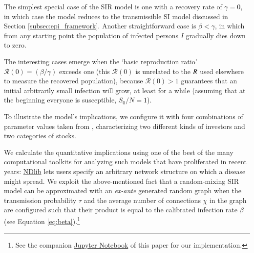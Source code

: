 The simplest special case of the SIR model is one with a recovery rate of $\gamma=0$, in which case the model reduces to the transmissible SI model discussed in Section \ref{subsec:epi_framework}.  Another straightforward case is $\beta < \gamma$, in which from any starting point the population of infected persons $I$ gradually dies down to zero.

\newcommand{\Rzero}{\mathcal{R}(0)}
The interesting cases emerge when the `basic reproduction ratio' $\Rzero = (\beta/\gamma)$ exceeds one (this $\Rzero$ is unrelated to the $\Recovered$ used elsewhere to measure the recovered population), because $\Rzero > 1$ guarantees that an initial arbitrarily small infection will grow, at least for a while (assuming that at the beginning everyone is susceptible, $S_{0}/N = 1$).

To illustrate the model's implications, we configure it with four combinations of parameter values taken from \cite{shiller1989survey}, characterizing two different kinds of investors and two categories of stocks.  %


We calculate the quantitative implications using one of the best of the many computational toolkits for analyzing such models that have proliferated in recent years:  %
\href{https://ndlib.readthedocs.io/en/latest/}{NDlib} lets users specify an arbitrary network structure on which a disease might spread. We exploit the above-mentioned fact that a random-mixing SIR model can be approximated with an \textit{ex-ante} generated random graph when the transmission probability $\tau$ and the average number of connections $\chi$ in the graph are configured such that their product is equal to the calibrated infection rate $\beta$ (see Equation \ref{eq:beta}).\footnote{See the companion \href{https://github.com/llorracc/EpiExp/blob/master/SIR_Ndlib.ipynb}{Jupyter Notebook} of this paper for our  implementation.}

